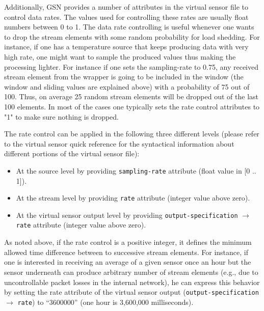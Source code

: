 Additionally, GSN provides a number of attributes in the virtual sensor file to control data rates.
The values used for controlling these rates are usually float numbers between 0 to 1.
The data rate controlling is useful whenever one wants to drop the stream elements with some random probability for load shedding. 
For instance, if one has a temperature source that keeps producing 
data with very high rate, one might want to sample the produced values 
thus making the processing lighter. For instance if one sets the 
sampling-rate to 0.75, any received stream element from the wrapper is going to be 
included in the window (the window and sliding values are explained above) with a probability of 75 out of 100.
Thus, on average 25 random stream elements will be dropped out of the last 100 elements.
In most of the cases one typically sets the rate control attributes to "1" to make sure nothing is dropped.

The rate control can be applied in the following three different levels (please refer to the virtual sensor quick reference for the syntactical
information about different portions of the virtual sensor file):
\begin{itemize}
\item At the source level by providing \texttt{sampling-rate} attribute (float value in [0 .. 1]).
\item At the stream level by providing \texttt{rate} attribute (integer value above zero).
\item At the virtual sensor output level by providing \texttt{output-specification} $\rightarrow$ \texttt{rate} attribute (integer value above zero).
\end{itemize}

As noted above, if the rate control is a positive integer, it defines the minimum allowed time difference between to successive stream elements.
For instance, if one is interested in receiving an average of a given sensor once an hour but the sensor underneath can produce arbitrary number of stream elements 
(e.g., due to uncontrollable packet losses in the internal network), he can express this behavior by setting the rate attribute of the virtual sensor output 
(\texttt{output-specification} $\rightarrow$ \texttt{rate}) to ``3600000'' (one hour is 3,600,000 milliseconds).

